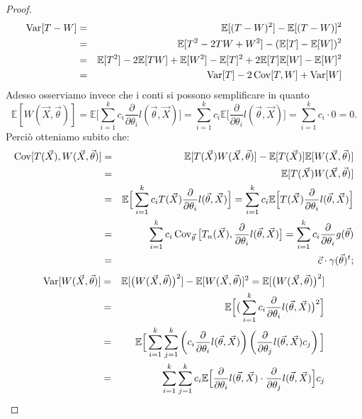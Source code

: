 \begin{proof}
\begin{eqnarray*}
\operatorname{Var}[T-W] &=& \mathbb{E}[(T-W)^2]-\mathbb{E}[(T-W)]^2 \\
&=& \mathbb{E}[T^2-2TW+W^2]-(\mathbb{E}[T]-\mathbb{E}[W])^2 \\
&=& \mathbb{E}[T^2]-2\mathbb{E}[TW]+\mathbb{E}[W^2]-\mathbb{E}[T]^2 +2\mathbb{E}[T]\mathbb{E}[W] -\mathbb{E}[W]^2 \\
&=& \operatorname{Var}[T] -2\operatorname{Cov}[T, W] +\operatorname{Var}[W]
\end{eqnarray*}
Adesso osserviamo invece che i conti si possono semplificare in quanto
$$
\mathbb{E}[W(\vec{X}, \vec{\theta})]=\mathbb{E}\Big[\sum_{i=1}^k c_i \frac{\partial}{\partial \theta_i} l(\vec{\theta}, \vec{X})\Big]=\sum_{i=1}^k c_i \mathbb{E}\Big[\frac{\partial}{\partial \theta_i} l(\vec{\theta}, \vec{X})\Big]=\sum_{i=1}^k c_i\cdot 0 = 0.
$$
Perciò otteniamo subito che:
\begin{eqnarray*}
\operatorname{Cov}[T(\vec{X}), W(\vec{X},\vec{\theta})]&=&\mathbb{E}[T(\vec{X}) W(\vec{X},\vec{\theta})]-\mathbb{E}[T(\vec{X})]\mathbb{E}[ W(\vec{X},\vec{\theta})] \\
&=& \mathbb{E}[T(\vec{X}) W(\vec{X},\vec{\theta})] \\
&=& \mathbb{E}\Big[\sum_{i=1}^k c_i T(\vec{X})\frac{\partial}{\partial \theta_i} l(\vec{\theta}, \vec{X})\Big]=\sum_{i=1}^k c_i\mathbb{E}\Big[T(\vec{X})\frac{\partial}{\partial \theta_i} l(\vec{\theta}, \vec{X})\Big] \\
&=& \sum_{i=1}^k c_i \operatorname{Cov}_{\vec{\theta}} \big[T_n(\vec{X}),\frac{\partial}{\partial\theta_i}l(\vec{\theta},\vec{X})\big] = \sum_{i=1}^k c_i \frac{\partial}{\partial\theta_i}g(\vec{\theta}) \\
&=& \vec{c}\cdot \gamma(\vec{\theta})^t;
\end{eqnarray*}
\begin{eqnarray*}
\var[W(\vec{X}, \vec{\theta})]&=&\mathbb{E}[\big(W(\vec{X}, \vec{\theta})\big)^2]-\mathbb{E}[W(\vec{X}, \vec{\theta})]^2=\mathbb{E}[\big(W(\vec{X}, \vec{\theta})\big)^2] \\
&=& \mathbb{E}\Big[\big(\sum_{i=1}^k c_i \frac{\partial}{\partial\theta_i} l(\vec{\theta}, \vec{X})\big)^2\Big] \\
&=& \mathbb{E}\Big[\sum_{i=1}^k \sum_{j=1}^k \left(c_i \frac{\partial}{\partial\theta_i} l(\vec{\theta}, \vec{X})\right)\left(\frac{\partial}{\partial\theta_j} l(\vec{\theta}, \vec{X}) c_j\right)\Big] \\
&=& \sum_{i=1}^k \sum_{j=1}^k   c_i \mathbb{E}\Big[\frac{\partial}{\partial\theta_i} l(\vec{\theta}, \vec{X})\cdot \frac{\partial}{\partial\theta_j} l(\vec{\theta}, \vec{X})\Big]c_j \\

\end{eqnarray*}
\end{proof}
